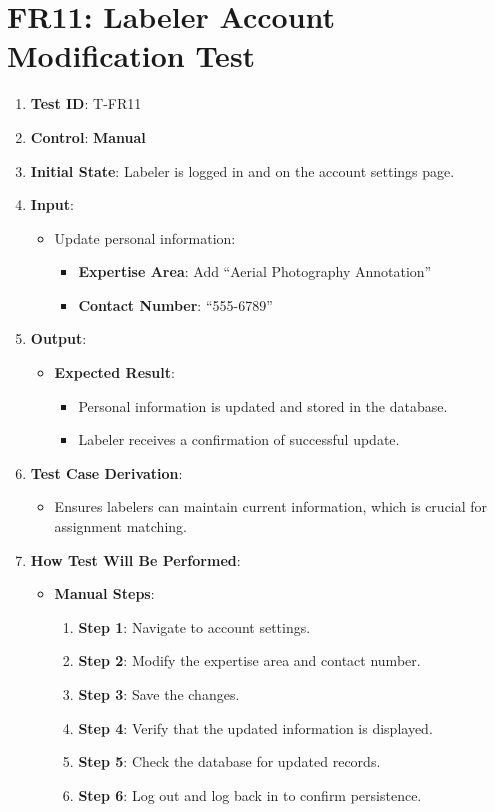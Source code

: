 \documentclass[12pt, titlepage]{article}
\begin{document}
\section*{FR11: Labeler Account Modification Test}

\begin{enumerate}
    \item \textbf{Test ID}: T-FR11
    \item \textbf{Control}: \textbf{Manual}
    \item \textbf{Initial State}: Labeler is logged in and on the account settings page.
    \item \textbf{Input}:
    \begin{itemize}
        \item Update personal information:
        \begin{itemize}
            \item \textbf{Expertise Area}: Add ``Aerial Photography Annotation''
            \item \textbf{Contact Number}: ``555-6789''
        \end{itemize}
    \end{itemize}
    \item \textbf{Output}:
    \begin{itemize}
        \item \textbf{Expected Result}:
        \begin{itemize}
            \item Personal information is updated and stored in the database.
            \item Labeler receives a confirmation of successful update.
        \end{itemize}
    \end{itemize}
    \item \textbf{Test Case Derivation}:
    \begin{itemize}
        \item Ensures labelers can maintain current information, which is crucial for assignment matching.
    \end{itemize}
    \item \textbf{How Test Will Be Performed}:
    \begin{itemize}
        \item \textbf{Manual Steps}:
        \begin{enumerate}
            \item \textbf{Step 1}: Navigate to account settings.
            \item \textbf{Step 2}: Modify the expertise area and contact number.
            \item \textbf{Step 3}: Save the changes.
            \item \textbf{Step 4}: Verify that the updated information is displayed.
            \item \textbf{Step 5}: Check the database for updated records.
            \item \textbf{Step 6}: Log out and log back in to confirm persistence.
        \end{enumerate}
    \end{itemize}
\end{enumerate}
\end{document}
